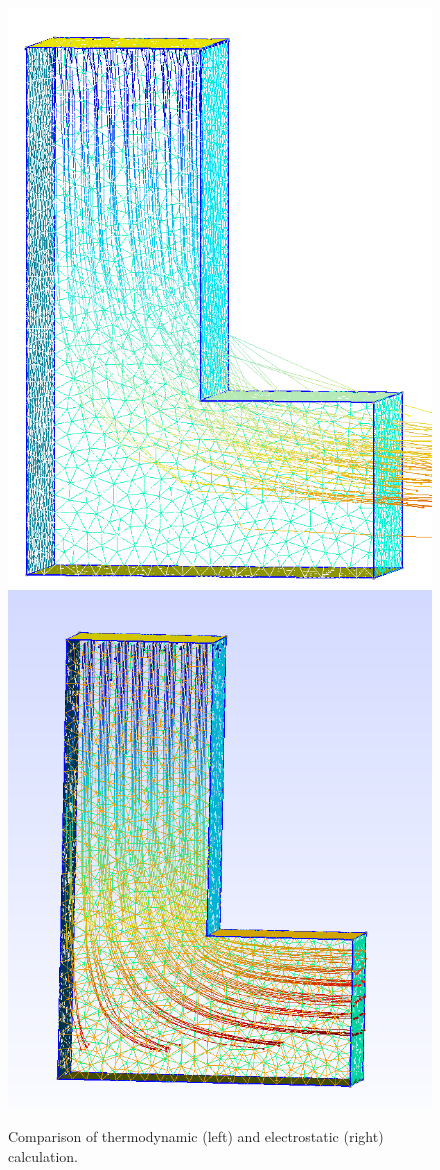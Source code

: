\documentclass[preprint,journal]{vgtc}       %
\begin{document}
\begin{figure}
	
	\begin{minipage}{\linewidth}
		\includegraphics[width=.5\linewidth]{L.PNG} 
		\includegraphics[width=.53\linewidth]{L-ele.png}
		\caption{Comparison of thermodynamic (left) and electrostatic (right) calculation.}
		\label{fig:L}
	\end{minipage}
\end{figure}
\end{document}
